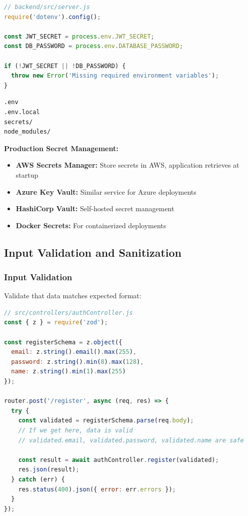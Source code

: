 \documentclass[12pt,a4paper,oneside]{article}
\begin{document}
\begin{lstlisting}[language=JavaScript, caption=Load Secrets at Runtime]
// backend/src/server.js
require('dotenv').config();

const JWT_SECRET = process.env.JWT_SECRET;
const DB_PASSWORD = process.env.DATABASE_PASSWORD;

if (!JWT_SECRET || !DB_PASSWORD) {
  throw new Error('Missing required environment variables');
}
\end{lstlisting}

\begin{lstlisting}[language=text, caption=.gitignore]
.env
.env.local
secrets/
node_modules/
\end{lstlisting}

\textbf{Production Secret Management:}

\begin{itemize}
    \item \textbf{AWS Secrets Manager:} Store secrets in AWS, application retrieves at startup
    \item \textbf{Azure Key Vault:} Similar service for Azure deployments
    \item \textbf{HashiCorp Vault:} Self-hosted secret management
    \item \textbf{Docker Secrets:} For containerized deployments
\end{itemize}

\subsection{Input Validation and Sanitization}

\subsubsection{Input Validation}

Validate that data matches expected format:

\begin{lstlisting}[language=JavaScript, caption=Input Validation with Zod]
// src/controllers/authController.js
const { z } = require('zod');

const registerSchema = z.object({
  email: z.string().email().max(255),
  password: z.string().min(8).max(128),
  name: z.string().min(1).max(255)
});

router.post('/register', async (req, res) => {
  try {
    const validated = registerSchema.parse(req.body);
    // If we get here, data is valid
    // validated.email, validated.password, validated.name are safe
    
    const result = await authController.register(validated);
    res.json(result);
  } catch (err) {
    res.status(400).json({ error: err.errors });
  }
});
\end{lstlisting}
\end{document}

